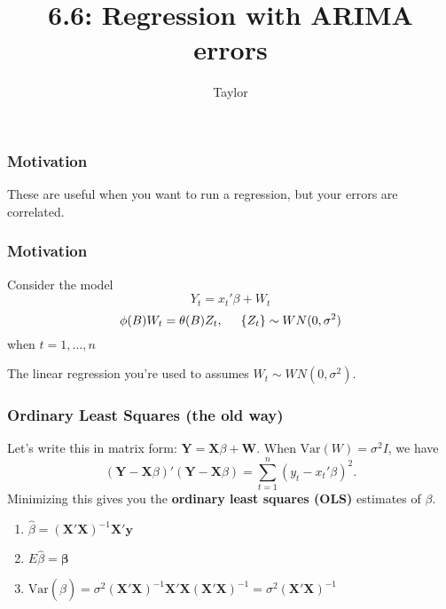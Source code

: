 \documentclass{beamer}
\title["6.6"]{6.6: Regression with ARIMA errors}
\author{Taylor}
\institute[UVA] 
{
University of Virginia \\
\medskip
\textit{} 
}
\date{}
\begin{document}

\begin{frame}
\titlepage 
\end{frame}


\begin{frame}
\frametitle{Motivation}

These are useful when you want to run a regression, but your errors are correlated.

\end{frame}


\begin{frame}
\frametitle{Motivation}

Consider the model
\[
Y_t = x_t'\beta + W_t
\]
\[
\phi(B)W_t = \theta(B)Z_t, \hspace{5mm} \{Z_t\} \sim WN(0,\sigma^2)
\]
when $t=1,\ldots,n$
\newline

The linear regression you're used to assumes $W_t \sim WN(0,\sigma^2)$.
\end{frame}


\begin{frame}
\frametitle{Ordinary Least Squares (the old way)}

Let's write this in matrix form: $\mathbf{Y} = \mathbf{X}\beta + \mathbf{W}$. When $\text{Var}(W) = \sigma^2 I$, we have
\[
(\mathbf{Y} - \mathbf{X}\beta )' (\mathbf{Y} - \mathbf{X}\beta ) = \sum_{t=1}^n (y_t - x_t'\beta)^2.
\]
Minimizing this gives you the {\bf ordinary least squares (OLS)} estimates of $\beta$.
\newline

\begin{enumerate}
\item $\hat{\beta} = (\mathbf{X}' \mathbf{X} )^{-1} \mathbf{X}'\mathbf{y}$
\item $E\hat{\beta} = \mathbf{\beta}$
\item $\text{Var}(\hat{\beta}) = \sigma^2 (\mathbf{X}' \mathbf{X} )^{-1} \mathbf{X}'\mathbf{X}(\mathbf{X}' \mathbf{X} )^{-1} = \sigma^2 (\mathbf{X}' \mathbf{X} )^{-1}$
\end{enumerate}



\end{frame}
\end{document}
